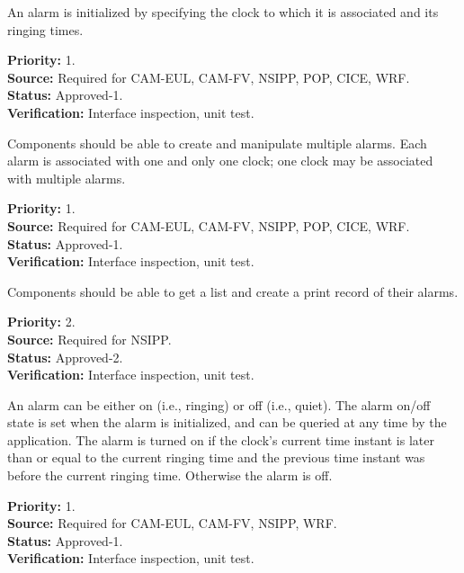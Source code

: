An alarm is initialized by specifying the clock to which it is associated 
and its ringing times. 
\begin{reqlist}
{\bf Priority:} 1. \\
{\bf Source:} Required for CAM-EUL, CAM-FV, NSIPP, POP, CICE, WRF. \\
{\bf Status:} Approved-1. \\
{\bf Verification:} Interface inspection, unit test. 
\end{reqlist}

Components should be able to create and manipulate multiple alarms.
Each alarm is associated with one and only one clock; one clock may
be associated with multiple alarms.
\begin{reqlist}
{\bf Priority:} 1. \\
{\bf Source:} Required for CAM-EUL, CAM-FV, NSIPP, POP, CICE, WRF. \\
{\bf Status:} Approved-1. \\
{\bf Verification:} Interface inspection, unit test. 
\end{reqlist}

Components should be able to get a list and create a print record of their alarms.
\begin{reqlist}
{\bf Priority:} 2. \\
{\bf Source:} Required for NSIPP. \\
{\bf Status:} Approved-2. \\
{\bf Verification:} Interface inspection, unit test. 
\end{reqlist}

An alarm can be either on (i.e., ringing) or off (i.e., quiet).
The alarm on/off state is set when the alarm is initialized, and can be queried
at any time by the application.  The alarm is turned on if the clock's current 
time instant is later than or equal to the current ringing time and the previous 
time instant was before the current ringing time.  Otherwise the alarm is off.
\begin{reqlist}
{\bf Priority:} 1. \\
{\bf Source:} Required for CAM-EUL, CAM-FV, NSIPP, WRF. \\
{\bf Status:} Approved-1. \\
{\bf Verification:} Interface inspection, unit test. 
\end{reqlist}

